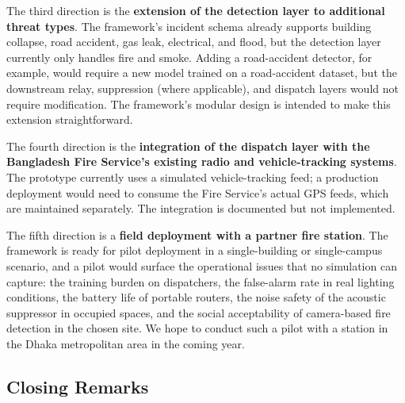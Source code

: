 The third direction is the \textbf{extension of the detection layer to additional threat types}. The framework's incident schema already supports building collapse, road accident, gas leak, electrical, and flood, but the detection layer currently only handles fire and smoke. Adding a road-accident detector, for example, would require a new model trained on a road-accident dataset, but the downstream relay, suppression (where applicable), and dispatch layers would not require modification. The framework's modular design is intended to make this extension straightforward.

The fourth direction is the \textbf{integration of the dispatch layer with the Bangladesh Fire Service's existing radio and vehicle-tracking systems}. The prototype currently uses a simulated vehicle-tracking feed; a production deployment would need to consume the Fire Service's actual GPS feeds, which are maintained separately. The integration is documented but not implemented.

The fifth direction is a \textbf{field deployment with a partner fire station}. The framework is ready for pilot deployment in a single-building or single-campus scenario, and a pilot would surface the operational issues that no simulation can capture: the training burden on dispatchers, the false-alarm rate in real lighting conditions, the battery life of portable routers, the noise safety of the acoustic suppressor in occupied spaces, and the social acceptability of camera-based fire detection in the chosen site. We hope to conduct such a pilot with a station in the Dhaka metropolitan area in the coming year.

\subsection{Closing Remarks}

